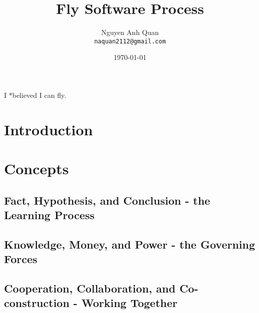\documentclass[10pt,a4paper]{report}
\begin{document}
\frontmatter

\title{Fly Software Process}
\author{Nguyen Anh Quan\\
  \texttt{naquan2112@gmail.com}}
\date{\today}
\maketitle

I *believed I can fly.

\tableofcontents

\mainmatter

\chapter{Introduction}

\lipsum[1-10]

\chapter{Concepts}
\section[Learning Process]{Fact, Hypothesis, and Conclusion - the Learning Process}

\lipsum[1-20]

\section[Governing Forces]{Knowledge, Money, and Power - the Governing Forces}

\lipsum[1-20]

\section[Working Together]{Cooperation, Collaboration, and Co-construction - Working Together}

\lipsum[1-20]

\backmatter
\end{document}
